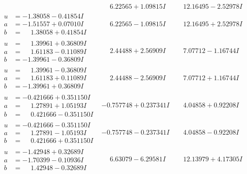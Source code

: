 \documentclass[1p]{elsarticle_modified}
\theoremstyle{definition}
\begin{document}
$$\begin{array}{c|c|c}
 & \phantom{-}6.22565 + 1.09815 I & \phantom{-}12.16495 - 2.52978 I \\ \hline\begin{aligned}
u &= -1.38058 - 0.41854 I \\
a &= -1.51557 + 0.07010 I \\
b &= \phantom{-}1.38058 + 0.41854 I\end{aligned}
 & \phantom{-}6.22565 - 1.09815 I & \phantom{-}12.16495 + 2.52978 I \\ \hline\begin{aligned}
u &= \phantom{-}1.39961 + 0.36809 I \\
a &= \phantom{-}1.61183 - 0.11089 I \\
b &= -1.39961 - 0.36809 I\end{aligned}
 & \phantom{-}2.44488 + 2.56909 I & \phantom{-}7.07712 - 1.16744 I \\ \hline\begin{aligned}
u &= \phantom{-}1.39961 - 0.36809 I \\
a &= \phantom{-}1.61183 + 0.11089 I \\
b &= -1.39961 + 0.36809 I\end{aligned}
 & \phantom{-}2.44488 - 2.56909 I & \phantom{-}7.07712 + 1.16744 I \\ \hline\begin{aligned}
u &= -0.421666 + 0.351150 I \\
a &= \phantom{-}1.27891 + 1.05193 I \\
b &= \phantom{-}0.421666 - 0.351150 I\end{aligned}
 & -0.757748 + 0.237341 I & \phantom{-}4.04858 + 0.92208 I \\ \hline\begin{aligned}
u &= -0.421666 - 0.351150 I \\
a &= \phantom{-}1.27891 - 1.05193 I \\
b &= \phantom{-}0.421666 + 0.351150 I\end{aligned}
 & -0.757748 - 0.237341 I & \phantom{-}4.04858 - 0.92208 I \\ \hline\begin{aligned}
u &= -1.42948 + 0.32689 I \\
a &= -1.70399 - 0.10936 I \\
b &= \phantom{-}1.42948 - 0.32689 I\end{aligned}
 & \phantom{-}6.63079 - 6.29581 I & \phantom{-}12.13979 + 4.17305 I \\ \hline\begin{aligned}

\end{aligned}
\end{array}$$
\end{document}
